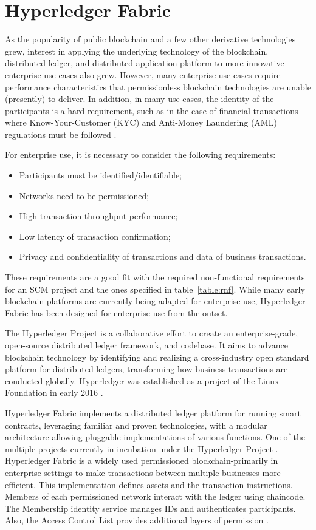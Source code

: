 \section{Hyperledger Fabric}\label{sec:hyperledger}

As the popularity of public blockchain and a few other derivative technologies grew, interest in applying the underlying technology of the blockchain, distributed ledger, and distributed application platform to more innovative enterprise use cases also grew. However, many enterprise use cases require performance characteristics that permissionless blockchain technologies are unable (presently) to deliver. In addition, in many use cases, the identity of the participants is a hard requirement, such as in the case of financial transactions where Know-Your-Customer (KYC) and Anti-Money Laundering (AML) regulations must be followed \cite{POLGE2020}.

For enterprise use, it is necessary to consider the following requirements:

\begin{itemize}
\item Participants must be identified/identifiable;
\item Networks need to be permissioned;
\item High transaction throughput performance;
\item Low latency of transaction confirmation;
\item Privacy and confidentiality of transactions and data of business transactions.
\end{itemize}

These requirements are a good fit with the required non-functional requirements for an SCM project and the ones specified in table~\ref{table:rnf}. While many early blockchain platforms are currently being adapted for enterprise use, Hyperledger Fabric has been designed for enterprise use from the outset. 

The Hyperledger Project is a collaborative effort to create an enterprise-grade, open-source distributed ledger framework, and codebase. It aims to advance blockchain technology by identifying and realizing a cross-industry open standard platform for distributed ledgers, transforming how business transactions are conducted globally. Hyperledger was established as a project of the Linux Foundation in early 2016 \cite{cachin2016architecture}.

Hyperledger Fabric implements a distributed ledger platform for running smart contracts, leveraging familiar and proven technologies, with a modular architecture allowing pluggable implementations of various functions. One of the multiple projects currently in incubation under the Hyperledger Project \cite{cachin2016architecture}. Hyperledger Fabric is a widely used permissioned blockchain-primarily in enterprise settings to make transactions between multiple businesses more efficient. This implementation defines assets and the transaction instructions. Members of each permissioned network interact with the ledger using chaincode. The Membership identity service manages IDs and authenticates participants. Also, the Access Control List provides additional layers of permission \cite{blockgeeks2018deeper}.

